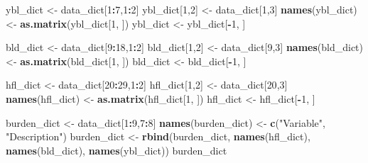 \documentclass[]{article}
\newenvironment{Shaded}{\begin{snugshade}}{\end{snugshade}}
\newcommand{\DecValTok}[1]{\textcolor[rgb]{0.00,0.00,0.81}{#1}}
\newcommand{\KeywordTok}[1]{\textcolor[rgb]{0.13,0.29,0.53}{\textbf{#1}}}
\newcommand{\NormalTok}[1]{#1}
\newcommand{\OperatorTok}[1]{\textcolor[rgb]{0.81,0.36,0.00}{\textbf{#1}}}
\newcommand{\StringTok}[1]{\textcolor[rgb]{0.31,0.60,0.02}{#1}}
\begin{document}
\begin{Shaded}
\begin{Highlighting}[]
\NormalTok{ybl_dict <-}\StringTok{ }\NormalTok{data_dict[}\DecValTok{1}\OperatorTok{:}\DecValTok{7}\NormalTok{,}\DecValTok{1}\OperatorTok{:}\DecValTok{2}\NormalTok{]}
\NormalTok{ybl_dict[}\DecValTok{1}\NormalTok{,}\DecValTok{2}\NormalTok{] <-}\StringTok{ }\NormalTok{data_dict[}\DecValTok{1}\NormalTok{,}\DecValTok{3}\NormalTok{]}
\KeywordTok{names}\NormalTok{(ybl_dict) <-}\StringTok{ }\KeywordTok{as.matrix}\NormalTok{(ybl_dict[}\DecValTok{1}\NormalTok{, ])}
\NormalTok{ybl_dict <-}\StringTok{ }\NormalTok{ybl_dict[}\OperatorTok{-}\DecValTok{1}\NormalTok{, ]}

\NormalTok{bld_dict <-}\StringTok{ }\NormalTok{data_dict[}\DecValTok{9}\OperatorTok{:}\DecValTok{18}\NormalTok{,}\DecValTok{1}\OperatorTok{:}\DecValTok{2}\NormalTok{]}
\NormalTok{bld_dict[}\DecValTok{1}\NormalTok{,}\DecValTok{2}\NormalTok{] <-}\StringTok{ }\NormalTok{data_dict[}\DecValTok{9}\NormalTok{,}\DecValTok{3}\NormalTok{]}
\KeywordTok{names}\NormalTok{(bld_dict) <-}\StringTok{ }\KeywordTok{as.matrix}\NormalTok{(bld_dict[}\DecValTok{1}\NormalTok{, ])}
\NormalTok{bld_dict <-}\StringTok{ }\NormalTok{bld_dict[}\OperatorTok{-}\DecValTok{1}\NormalTok{, ]}

\NormalTok{hfl_dict <-}\StringTok{ }\NormalTok{data_dict[}\DecValTok{20}\OperatorTok{:}\DecValTok{29}\NormalTok{,}\DecValTok{1}\OperatorTok{:}\DecValTok{2}\NormalTok{]}
\NormalTok{hfl_dict[}\DecValTok{1}\NormalTok{,}\DecValTok{2}\NormalTok{] <-}\StringTok{ }\NormalTok{data_dict[}\DecValTok{20}\NormalTok{,}\DecValTok{3}\NormalTok{]}
\KeywordTok{names}\NormalTok{(hfl_dict) <-}\StringTok{ }\KeywordTok{as.matrix}\NormalTok{(hfl_dict[}\DecValTok{1}\NormalTok{, ])}
\NormalTok{hfl_dict <-}\StringTok{ }\NormalTok{hfl_dict[}\OperatorTok{-}\DecValTok{1}\NormalTok{, ]}

\NormalTok{burden_dict <-}\StringTok{ }\NormalTok{data_dict[}\DecValTok{1}\OperatorTok{:}\DecValTok{9}\NormalTok{,}\DecValTok{7}\OperatorTok{:}\DecValTok{8}\NormalTok{]}
\KeywordTok{names}\NormalTok{(burden_dict) <-}\StringTok{ }\KeywordTok{c}\NormalTok{(}\StringTok{"Variable"}\NormalTok{, }\StringTok{"Description"}\NormalTok{)}
\NormalTok{burden_dict <-}\StringTok{ }\KeywordTok{rbind}\NormalTok{(burden_dict, }
                     \KeywordTok{names}\NormalTok{(hfl_dict), }
                     \KeywordTok{names}\NormalTok{(bld_dict), }
                     \KeywordTok{names}\NormalTok{(ybl_dict))}
\NormalTok{burden_dict}
\end{Highlighting}
\end{Shaded}
\end{document}
